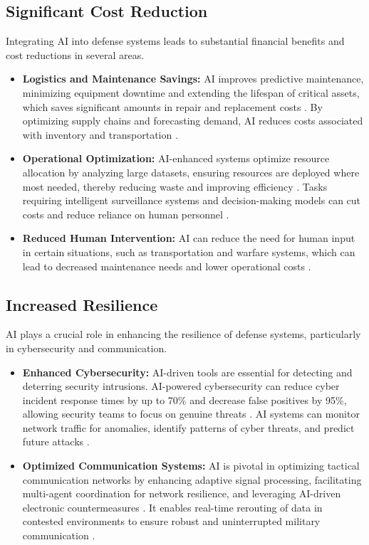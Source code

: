 \subsection{Significant Cost Reduction}
Integrating AI into defense systems leads to substantial financial benefits and cost reductions in several areas.
\begin{itemize}
    \item \textbf{Logistics and Maintenance Savings:} AI improves predictive maintenance, minimizing equipment downtime and extending the lifespan of critical assets, which saves significant amounts in repair and replacement costs \cite{IronVector_Benefits}. By optimizing supply chains and forecasting demand, AI reduces costs associated with inventory and transportation \cite{IronVector_Benefits}. 
    \item \textbf{Operational Optimization:} AI-enhanced systems optimize resource allocation by analyzing large datasets, ensuring resources are deployed where most needed, thereby reducing waste and improving efficiency \cite{IronVector_Benefits}. Tasks requiring intelligent surveillance systems and decision-making models can cut costs and reduce reliance on human personnel \cite{DefenceIndustries_Benefits}.
    \item \textbf{Reduced Human Intervention:} AI can reduce the need for human input in certain situations, such as transportation and warfare systems, which can lead to decreased maintenance needs and lower operational costs \cite{SDI_Benefits}.
\end{itemize}

\subsection{Increased Resilience}
AI plays a crucial role in enhancing the resilience of defense systems, particularly in cybersecurity and communication.
\begin{itemize}
    \item \textbf{Enhanced Cybersecurity:} AI-driven tools are essential for detecting and deterring security intrusions. AI-powered cybersecurity can reduce cyber incident response times by up to 70\% and decrease false positives by 95\%, allowing security teams to focus on genuine threats \cite{AtekInc_Benefits}. AI systems can monitor network traffic for anomalies, identify patterns of cyber threats, and predict future attacks \cite{Scielo_Benefits}.
    \item \textbf{Optimized Communication Systems:} AI is pivotal in optimizing tactical communication networks by enhancing adaptive signal processing, facilitating multi-agent coordination for network resilience, and leveraging AI-driven electronic countermeasures \cite{MDPI_Benefits}. It enables real-time rerouting of data in contested environments to ensure robust and uninterrupted military communication \cite{GlobalPI_Benefits}.
\end{itemize}

